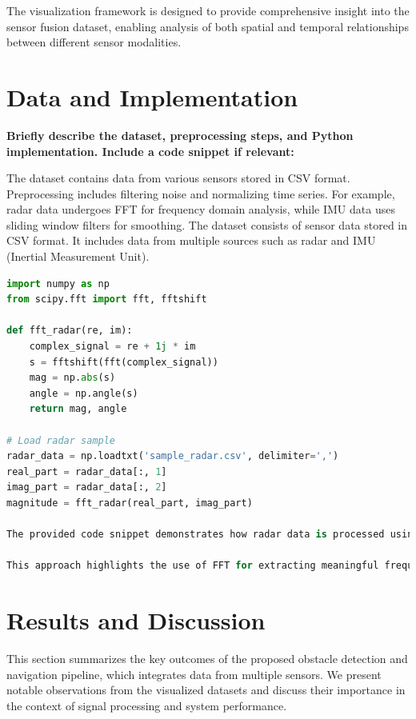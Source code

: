 \documentclass[12pt,a4paper]{article}
\begin{document}
The visualization framework is designed to provide comprehensive insight into the sensor fusion dataset, enabling analysis of both spatial and temporal relationships between different sensor modalities.
\section{Data and Implementation}
\textbf{Briefly describe the dataset, preprocessing steps, and Python implementation. Include a code snippet if relevant:}

The dataset contains data from various sensors stored in CSV format. Preprocessing includes filtering noise and normalizing time series. For example, radar data undergoes FFT for frequency domain analysis, while IMU data uses sliding window filters for smoothing.
The dataset consists of sensor data stored in CSV format. It includes data from multiple sources such as radar and IMU (Inertial Measurement Unit).

\begin{lstlisting}[language=Python, caption=Radar Data undergoes FFT]
import numpy as np
from scipy.fft import fft, fftshift

def fft_radar(re, im):
    complex_signal = re + 1j * im
    s = fftshift(fft(complex_signal))
    mag = np.abs(s)
    angle = np.angle(s)
    return mag, angle

# Load radar sample
radar_data = np.loadtxt('sample_radar.csv', delimiter=',')
real_part = radar_data[:, 1]
imag_part = radar_data[:, 2]
magnitude = fft_radar(real_part, imag_part)

The provided code snippet demonstrates how radar data is processed using FFT. The real and imaginary components are loaded from the CSV file, transformed into the frequency domain, and combined to calculate the magnitude spectrum.

This approach highlights the use of FFT for extracting meaningful frequency-domain features from radar signals, which is crucial for further analysis.

\end{lstlisting}
\section{Results and Discussion}

This section summarizes the key outcomes of the proposed obstacle detection and navigation pipeline, which integrates data from multiple sensors. We present notable observations from the visualized datasets and discuss their importance in the context of signal processing and system performance.
\end{document}

